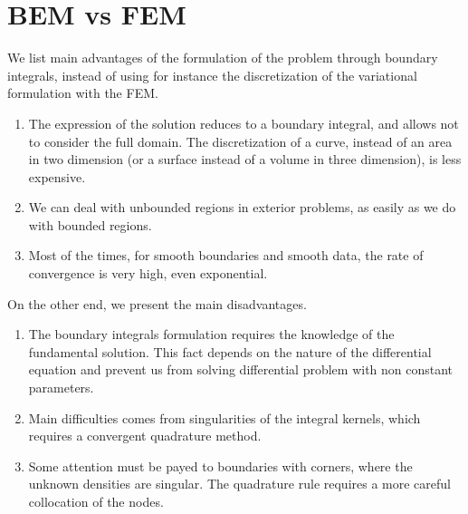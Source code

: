 \documentclass[10pt, a4paper]{article} %
\numberwithin{equation}{section}
\theoremstyle{definition}
\theoremstyle{plain}
\theoremstyle{plain}
\theoremstyle{plain}
\theoremstyle{plain}
\theoremstyle{plain}
\theoremstyle{plain}
\theoremstyle{plain}
\theoremstyle{plain}
\begin{document}
\section{BEM vs FEM}
\label{section:bemfem}
We list main advantages of the formulation of the problem through boundary integrals, 
instead of using for instance the discretization of the variational formulation with the FEM.
\begin{enumerate}
 \item The expression of the solution reduces to a boundary integral,
 and allows not to consider the full domain. The discretization of a curve, instead of an area 
 in two dimension (or a surface instead of a volume in three dimension), is less expensive.
 \item We can deal with unbounded regions in exterior problems, as easily as we do with bounded regions.
 \item Most of the times, for smooth boundaries and smooth data, the rate of convergence is very high, even exponential.
\end{enumerate}
On the other end, we present the main disadvantages.
\begin{enumerate}
 \item The boundary integrals formulation requires the knowledge of the fundamental solution. 
 This fact depends on the nature of the differential equation 
 and prevent us from solving 
 differential problem with non constant parameters.
 \item Main difficulties comes from singularities of the integral kernels, 
 which requires a convergent quadrature method.
 \item Some attention must be payed to boundaries with corners, 
 where the unknown densities are singular. The quadrature rule requires a more 
 careful collocation of the nodes.
\end{enumerate}
\end{document}
